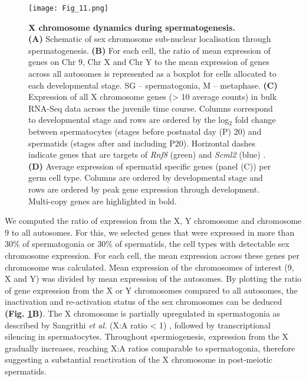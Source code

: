 \begin{figure}[!h]
\centering
\texttt{[image: Fig\_11.png]}
\caption[X chromosome dynamics during spermatogenesis]{\textbf{X chromosome dynamics during spermatogenesis.} \\
\textbf{(A)} Schematic of sex chromosome sub-nuclear localisation through spermatogenesis. \textbf{(B)} For each cell, the ratio of mean expression of genes on Chr 9, Chr X and Chr Y to the mean expression of genes across all autosomes is represented as a boxplot for cells allocated to each developmental stage. SG – spermatogonia, M – metaphase. \textbf{(C)} Expression of all X chromosome genes (> 10 average counts) in bulk RNA-Seq data across the juvenile time course. Columns correspond to developmental stage and rows are ordered by the log$_2$ fold change between spermatocytes (stages before postnatal day (P) 20) and spermatids (stages after and including P20). Horizontal dashes indicate genes that are targets of \textit{Rnf8} (green) and \textit{Scml2} (blue) \citep{Adams2018}. \textbf{(D)} Average expression of spermatid specific genes (panel (C)) per germ cell type. Columns are ordered by developmental stage and rows are ordered by peak gene expression through development. Multi-copy genes are highlighted in bold.}
\label{fig3:X_reactivation}
\end{figure}

\newpage

We computed the ratio of expression from the X, Y chromosome and chromosome 9 to all autosomes. For this, we selected genes that were expressed in more than 30\% of spermatogonia or 30\% of spermatids, the cell types with detectable sex chromosome expression. For each cell, the mean expression across these genes per chromosome was calculated. Mean expression of the chromosomes of interest (9, X and Y) was divided by mean expression of the autosomes. By plotting the ratio of gene expression from the X or Y chromosomes compared to all autosomes, the inactivation and re-activation status of the sex chromosomes can be deduced \textbf{(Fig. \ref{fig3:X_reactivation}B)}. The X chromosome is partially upregulated in spermatogonia as described by Sangrithi \emph{et al.} (X:A ratio < 1) \citep{Sangrithi2017}, followed by transcriptional silencing in spermatocytes. Throughout spermiogenesis, expression from the X gradually increases, reaching X:A ratios comparable to spermatogonia, therefore suggesting a substantial reactivation of the X chromosome in post-meiotic spermatids. \\

